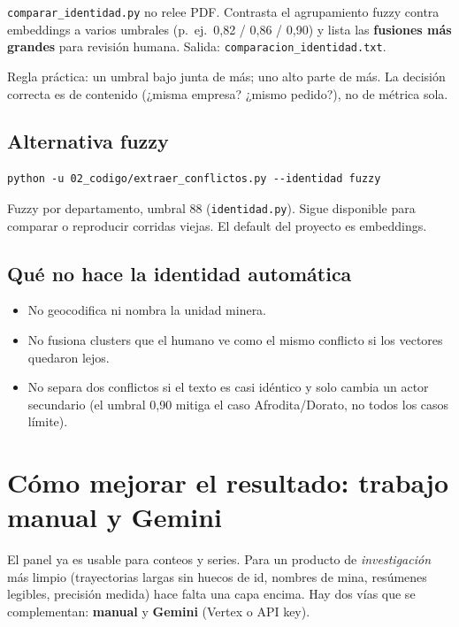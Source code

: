 \documentclass[11pt,a4paper]{article}
\begin{document}
\texttt{comparar\_identidad.py} no relee PDF. Contrasta el agrupamiento fuzzy contra embeddings a varios umbrales (p.\ ej.\ 0{,}82 / 0{,}86 / 0{,}90) y lista las \textbf{fusiones más grandes} para revisión humana. Salida: \texttt{comparacion\_identidad.txt}.

Regla práctica: un umbral bajo junta de más; uno alto parte de más. La decisión correcta es de contenido (¿misma empresa? ¿mismo pedido?), no de métrica sola.

\subsection{Alternativa fuzzy}

\begin{verbatim}
python -u 02_codigo/extraer_conflictos.py --identidad fuzzy
\end{verbatim}

Fuzzy por departamento, umbral 88 (\texttt{identidad.py}). Sigue disponible para comparar o reproducir corridas viejas. El default del proyecto es embeddings.

\subsection{Qué no hace la identidad automática}

\begin{itemize}
  \item No geocodifica ni nombra la unidad minera.
  \item No fusiona clusters que el humano ve como el mismo conflicto si los vectores quedaron lejos.
  \item No separa dos conflictos si el texto es casi idéntico y solo cambia un actor secundario (el umbral 0{,}90 mitiga el caso Afrodita/Dorato, no todos los casos límite).
\end{itemize}

\section{Cómo mejorar el resultado: trabajo manual y Gemini}

El panel ya es usable para conteos y series. Para un producto de \emph{investigación} más limpio (trayectorias largas sin huecos de id, nombres de mina, resúmenes legibles, precisión medida) hace falta una capa encima. Hay dos vías que se complementan: \textbf{manual} y \textbf{Gemini} (Vertex o API key).
\end{document}
